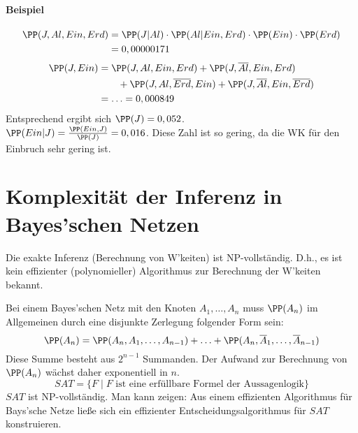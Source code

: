 \paragraph{Beispiel} 
\begin{align*}
\PP(J, Al, Ein, Erd) &= \PP(J|Al) \cdot \PP(Al|Ein, Erd) \cdot \PP(Ein) \cdot \PP(Erd)\\
&= 0,00000171
\end{align*}
\begin{align*}
\PP(J, Ein) &= \PP(J, Al, Ein, Erd) + \PP(J, \overline{Al}, Ein, Erd)\\
& \qquad +\PP(J, Al, \overline{Erd}, Ein) + \PP(J, \overline{Al}, Ein, \overline{Erd})\\
&= \ldots = 0,000849
\end{align*}
Entsprechend ergibt sich $\PP(J) = 0,052$.\\
$\PP(Ein|J) = \frac{\PP(Ein, J)}{\PP(J)}=0,016$. Diese Zahl ist so gering, da die WK für den Einbruch sehr gering ist.

\section{Komplexität der Inferenz in Bayes'schen Netzen}
Die exakte Inferenz (Berechnung von W'keiten) ist NP-vollständig. D.h., es ist kein effizienter (polynomieller) Algorithmus zur Berechnung der W'keiten bekannt.

Bei einem Bayes'schen Netz mit den Knoten $A_1, \dots, A_n$ muss $\PP(A_n)$ im Allgemeinen durch eine disjunkte Zerlegung folgender Form sein:
$$\PP(A_n) = \PP(A_n, A_1, \dots, A_{n-1})+\ldots + \PP(A_n, \overline{A}_1, \dots,  \overline{A}_{n-1})$$
Diese Summe besteht aus $2^{n-1}$ Summanden. Der Aufwand zur Berechnung von $\PP(A_n)$ wächst daher exponentiell in $n$.
$$SAT=\{F\;|\; F \text{ ist eine erfüllbare Formel der Aussagenlogik}\}$$
$SAT$ ist NP-vollständig. Man kann zeigen: Aus einem effizienten Algorithmus für Bays'sche Netze ließe sich ein effizienter Entscheidungsalgorithmus für $SAT$ konstruieren.

